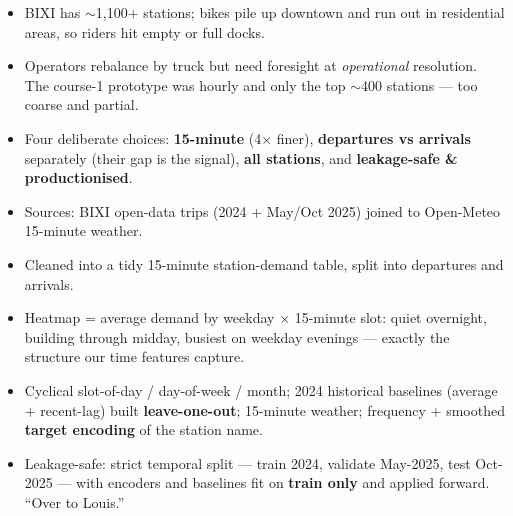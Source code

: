 \documentclass[11pt]{article}
\newcommand{\x}{$\times$}
\newcommand{\presenter}[2]{\par\medskip\noindent{\color{#2}\rule{3pt}{12pt}}\hspace{4pt}{\bfseries #1}\par}
\begin{document}
\presenter{Slide 1 --- The rebalancing problem \& why our design fits}{teal}
\begin{itemize}
  \item BIXI has $\sim$1,100+ stations; bikes pile up downtown and run out in residential areas, so
        riders hit empty or full docks.
  \item Operators rebalance by truck but need foresight at \emph{operational} resolution. The
        course-1 prototype was hourly and only the top $\sim$400 stations --- too coarse and partial.
  \item Four deliberate choices: \textbf{15-minute} (4\x{} finer), \textbf{departures vs arrivals}
        separately (their gap is the signal), \textbf{all stations}, and \textbf{leakage-safe \&
        productionised}.
\end{itemize}

\presenter{Slide 2 --- Data: sources, cleaning, and what demand looks like}{teal}
\begin{itemize}
  \item Sources: BIXI open-data trips (2024 + May/Oct 2025) joined to Open-Meteo 15-minute weather.
  \item Cleaned into a tidy 15-minute station-demand table, split into departures and arrivals.
  \item Heatmap = average demand by weekday \x{} 15-minute slot: quiet overnight, building through
        midday, busiest on weekday evenings --- exactly the structure our time features capture.
\end{itemize}

\presenter{Slide 3 --- Feature engineering, leakage-safe}{teal}
\begin{itemize}
  \item Cyclical slot-of-day / day-of-week / month; 2024 historical baselines (average + recent-lag)
        built \textbf{leave-one-out}; 15-minute weather; frequency + smoothed \textbf{target encoding}
        of the station name.
  \item Leakage-safe: strict temporal split --- train 2024, validate May-2025, test Oct-2025 ---
        with encoders and baselines fit on \textbf{train only} and applied forward. ``Over to Louis.''
\end{itemize}

\end{document}

